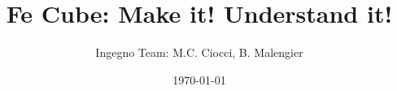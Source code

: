 \documentclass[11pt]{article}
\begin{document}
 \title{Fe Cube: Make it! Understand it!}
 \author{Ingegno Team: M.C. Ciocci, B. Malengier}
 \date{\today}
 \maketitle

\begin{Parallel}{7.5cm}{7.5cm}


\newpage


\end{Parallel}
\end{document}
